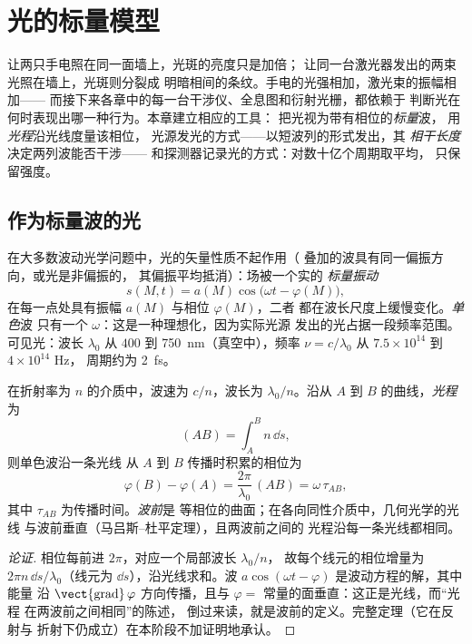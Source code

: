 \chapter{光的标量模型}\label{ch:b2:scalar-light-model}

让两只手电照在同一面墙上，光斑的亮度只是加倍；
让同一台激光器发出的两束光照在墙上，光斑则分裂成
明暗相间的条纹。手电的光强相加，激光束的振幅相加——
而接下来各章中的每一台干涉仪、全息图和衍射光栅，都依赖于
判断光在何时表现出哪一种行为。本章建立相应的工具：
把光视为带有相位的\emph{标量}波，
用\emph{光程}沿光线度量该相位，
光源发光的方式——以短波列的形式发出，其
\emph{相干长度}决定两列波能否干涉——
和探测器记录光的方式：对数十亿个周期取平均，
只保留强度。

\section{作为标量波的光}

\begin{definition}\label{def:b2:scalar-light-model:scalar}
在大多数波动光学问题中，光的矢量性质不起作用（
叠加的波具有同一偏振方向，或光是非偏振的，
其偏振平均抵消）：场被一个实的
\emph{标量振动}
\[
s(M, t) = a(M)\cos\bigl(\omega t - \varphi(M)\bigr) ,
\]
在每一点处具有振幅 $a(M)$ 与相位 $\varphi(M)$，二者
都在波长尺度上缓慢变化。\emph{单色}波
只有一个 $\omega$：这是一种理想化，因为实际光源
发出的光占据一段频率范围。可见光：波长 $\lambda_0$ 从 $400$ 到
\qty{750}{nm}（真空中），频率 $\nu = c/\lambda_0$ 从 $7.5 \times 10^{14}$ 到 $4 \times 10^{14}$ Hz，
周期约为 \qty{2}{fs}。
\end{definition}

\begin{definition}[光程与相位]\label{def:b2:scalar-light-model:path}
在折射率为 $n$ 的介质中，波速为 $c/n$，波长为
$\lambda_0/n$。沿从 $A$ 到 $B$ 的曲线，\emph{光程}为
\[
(AB) = \int_A^Bn\,\dd s ,
\]
则单色波沿一条光线
从 $A$ 到 $B$ 传播时积累的相位为
\[
\varphi(B) - \varphi(A) = \frac{2\pi}{\lambda_0}\,(AB) = \omega\,\tau_{AB} ,
\]
其中 $\tau_{AB}$ 为传播时间。\emph{波前}是
等相位的曲面；在各向同性介质中，几何光学的光线
与波前垂直（马吕斯–杜平定理），且两波前之间的
光程沿每一条光线都相同。
\end{definition}

\begin{proof}[论证]
相位每前进 $2\pi$，对应一个局部波长 $\lambda_0/n$，
故每个线元的相位增量为 $2\pi n\,\dd s/\lambda_0$（线元为 $\dd s$），沿光线求和。波
$a\cos(\omega t - \varphi)$ 是波动方程的解，其中能量
沿 $\operatorname{\vect{grad}}\varphi$ 方向传播，且与
$\varphi = $ 常量的面垂直：这正是光线，而“光程
在两波前之间相同”的陈述，
倒过来读，就是波前的定义。完整定理（它在反射与
折射下仍成立）在本阶段不加证明地承认。
\end{proof}

